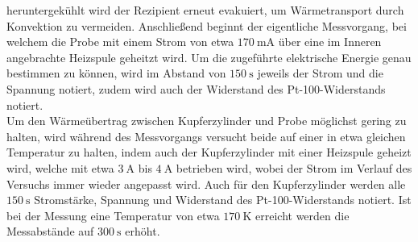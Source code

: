 heruntergekühlt wird der Rezipient erneut evakuiert, um Wärmetransport
durch Konvektion zu vermeiden. Anschließend beginnt der eigentliche
Messvorgang, bei welchem die Probe mit einem Strom von etwa $\SI{170}{\milli\ampere}$
über eine im Inneren angebrachte Heizspule geheitzt wird. Um die zugeführte elektrische
Energie genau bestimmen zu können, wird im Abstand von $\SI{150}{\second}$ jeweils
der Strom und die Spannung notiert, zudem wird auch der Widerstand des Pt-100-Widerstands
notiert. \\
Um den Wärmeübertrag zwischen Kupferzylinder und Probe möglichst gering zu halten,
wird während des Messvorgangs versucht beide auf einer in etwa gleichen Temperatur zu
halten, indem auch der Kupferzylinder mit einer Heizspule geheizt wird, welche
mit etwa $\SI{3}{\ampere}$ bis $\SI{4}{\ampere}$ betrieben wird, wobei der Strom
im Verlauf des Versuchs immer wieder angepasst wird. Auch für den Kupferzylinder
werden alle $\SI{150}{\second}$ Stromstärke, Spannung und Widerstand des
Pt-100-Widerstands notiert. Ist bei der Messung eine Temperatur von etwa
$\SI{170}{\kelvin}$ erreicht werden die Messabstände auf $\SI{300}{\second}$ erhöht.
